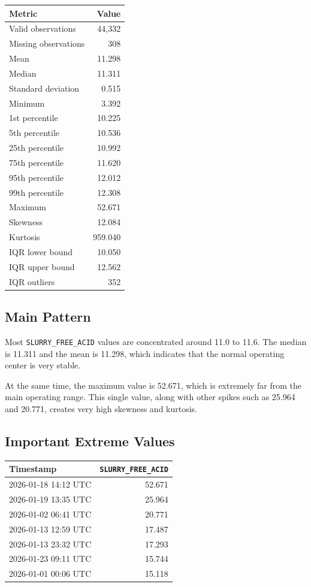 \documentclass[11pt,a4paper]{article}
\begin{document}
\begin{longtable}{lr}
\toprule
Metric & Value \\
\midrule
Valid observations & 44,332 \\
Missing observations & 308 \\
Mean & 11.298 \\
Median & 11.311 \\
Standard deviation & 0.515 \\
Minimum & 3.392 \\
1st percentile & 10.225 \\
5th percentile & 10.536 \\
25th percentile & 10.992 \\
75th percentile & 11.620 \\
95th percentile & 12.012 \\
99th percentile & 12.308 \\
Maximum & 52.671 \\
Skewness & 12.084 \\
Kurtosis & 959.040 \\
IQR lower bound & 10.050 \\
IQR upper bound & 12.562 \\
IQR outliers & 352 \\
\bottomrule
\end{longtable}

\subsection{Main Pattern}

Most \texttt{SLURRY\_FREE\_ACID} values are concentrated around 11.0 to 11.6. The median is 11.311 and the mean is 11.298, which indicates that the normal operating center is very stable.

At the same time, the maximum value is 52.671, which is extremely far from the main operating range. This single value, along with other spikes such as 25.964 and 20.771, creates very high skewness and kurtosis.

\subsection{Important Extreme Values}

\begin{longtable}{p{5cm}r}
\toprule
Timestamp & \texttt{SLURRY\_FREE\_ACID} \\
\midrule
2026-01-18 14:12 UTC & 52.671 \\
2026-01-19 13:35 UTC & 25.964 \\
2026-01-02 06:41 UTC & 20.771 \\
2026-01-13 12:59 UTC & 17.487 \\
2026-01-13 23:32 UTC & 17.293 \\
2026-01-23 09:11 UTC & 15.744 \\
2026-01-01 00:06 UTC & 15.118 \\
\bottomrule
\end{longtable}
 
\end{document}
